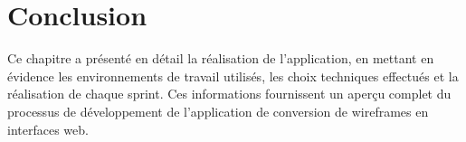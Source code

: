 \section{Conclusion}

Ce chapitre a présenté en détail la réalisation de l'application, en mettant en évidence les environnements de travail utilisés, les choix techniques effectués et la réalisation de chaque sprint. Ces informations fournissent un aperçu complet du processus de développement de l'application de conversion de wireframes en interfaces web.

